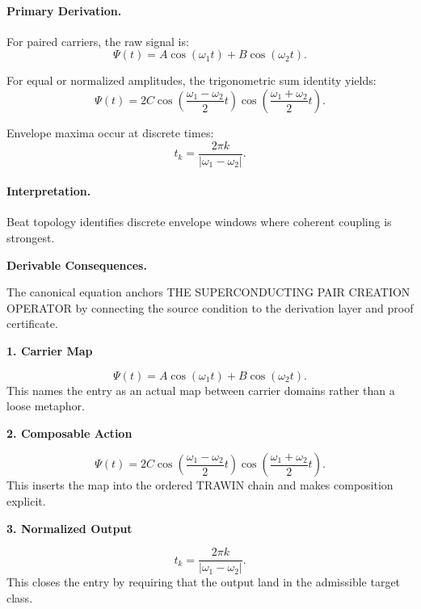 \paragraph{Primary Derivation.}
For paired carriers, the raw signal is:
\begin{equation}
\Psi(t)=A\cos(\omega_1t)+B\cos(\omega_2t).
\end{equation}

For equal or normalized amplitudes, the trigonometric sum identity yields:
\begin{equation}
\Psi(t)
=
2C
\cos\left(
\frac{\omega_1-\omega_2}{2}t
\right)
\cos\left(
\frac{\omega_1+\omega_2}{2}t
\right).
\end{equation}

Envelope maxima occur at discrete times:
\begin{equation}
\boxed{
t_k=
\frac{2\pi k}{|\omega_1-\omega_2|}.
}
\end{equation}

\paragraph{Interpretation.}
Beat topology identifies discrete envelope windows where coherent coupling is strongest.

\par\vspace{0.35em}
\noindent\textbf{Derivable Consequences.}\quad
\begingroup
\footnotesize
\raggedright
The canonical equation anchors THE SUPERCONDUCTING PAIR CREATION OPERATOR by connecting the source condition to the derivation layer and proof certificate.
\par\endgroup

\noindent\textbf{1. Carrier Map}\par
\[
\Psi(t)=A\cos(\omega_1t)+B\cos(\omega_2t).
\]
\noindent This names the entry as an actual map between carrier domains rather than a loose metaphor.\par
\noindent\textbf{2. Composable Action}\par
\[
\Psi(t) = 2C \cos\left( \frac{\omega_1-\omega_2}{2}t \right) \cos\left( \frac{\omega_1+\omega_2}{2}t \right).
\]
\noindent This inserts the map into the ordered TRAWIN chain and makes composition explicit.\par
\noindent\textbf{3. Normalized Output}\par
\[
t_k= \frac{2\pi k}{|\omega_1-\omega_2|}.
\]
\noindent This closes the entry by requiring that the output land in the admissible target class.\par

